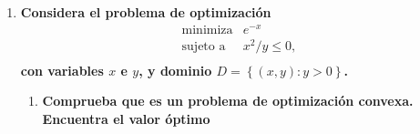 \begin{enumerate}
\begin{comment}
	    para $\lambda \leq 0$. Esto significa que el valor óptimo del problema dual es $5$, que es igual al valor óptimo del problema primal. Esto es consistente con la teoría de la optimización, que establece que bajo ciertas condiciones (llamadas condiciones de Slater), el valor óptimo del problema primal es igual al valor óptimo del problema dual. Esto se conoce como dualidad fuerte.



	\item \textbf{\boldmath Describe el problema dual y comprueba que se trata de un problema de maximización cóncavo. Encuentra el valor dual óptimo $d^+$ y la solución dual óptima $\lambda^*$ ¿Se verifica la dualidad fuerte? Representa el conjunto $G\subset \mathbb{R}^2$}.\\

	    \textbf{Solución:}

    \end{enumerate}

    \item \textbf{\boldmath ¿Cuáles son las condiciones de Slater asociadas al problema lineal
    $$
    \begin{array}{ll}
	\text{minimiza} & x^Tx\\
	\text{sujeto a} & Ax=b?
    \end{array}
    $$
    Se sabe que las condiciones de Slater implican que se verifica la dualidad fuerte. Describe esta situación para el problema lineal planteado. ¿Es posible aplicar las condiciones de Slater al problema 1?}\\

	\textbf{Solución:}

\end{comment}


    \item \textbf{\boldmath Considera el problema de optimización
    $$
    \begin{array}{ll}
	\text{minimiza} & e^{-x}\\
	\text{sujeto a} & x^2/y\leq 0,\\
    \end{array}
    $$
    con variables $x$ e $y$, y dominio $D=\left\{(x,y):y>0\right\}$.}
    \begin{enumerate}[\bfseries (a)]

	\item \textbf{\boldmath Comprueba que es un problema de optimización convexa. Encuentra el valor óptimo}\\


\end{enumerate}
\end{enumerate}
